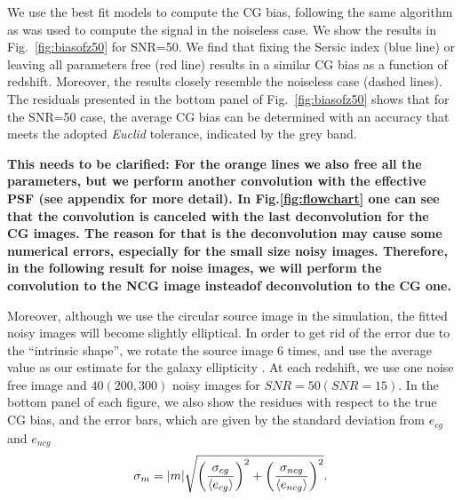 \documentclass[useAMS,usenatbib]{mnras}
\newcommand{\be}{\begin{equation}}
\newcommand{\ee}{\end{equation}}
\newcommand{\rund}[1]{\left(#1\right)}
\def\elabel#1{\label{eq:#1}}
\begin{document}
We use the best fit models to compute the CG bias, following the same
algorithm as was used to compute the signal in the noiseless case. 
We show the results in Fig.~\ref{fig:biasofz50} for SNR=50. We find that
fixing the Sersic index (blue line) or leaving all parameters free (red line)
results in a similar CG bias as a function of redshift. Moreover, the results
closely resemble the noiseless case (dashed lines).  The residuals
presented in the bottom panel of Fig.~\ref{fig:biasofz50} shows that 
for the SNR=50 case, the average CG bias can be determined with an
accuracy that meets the adopted {\it Euclid} tolerance, indicated by the grey band.


{\bf  This needs to be clarified: For the orange lines we also free all
the parameters, but we perform another convolution with the effective
PSF (see appendix for more detail). In Fig.\ref{fig:flowchart} one can
see that the convolution is canceled with the last deconvolution for
the CG images.  The reason for that is the deconvolution may cause
some numerical errors, especially for the small size noisy images.  Therefore, 
in the following result for noise images, we will perform the convolution to the NCG 
image insteadof deconvolution to the CG one.}


Moreover, although we use the circular source image in the simulation,
the fitted noisy images will become slightly elliptical. In order to
get rid of the error due to the ``intrinsic shape'', we rotate the
source image $6$ times, and use the average value as our estimate for
the galaxy ellipticity \citep{2007AJ....133.1763N}. At each redshift,
we use one noise free image and $40 (200, 300)$ noisy images for $SNR=50
(SNR=15)$.  In the bottom panel of each figure, we also show the
residues with respect to the true CG bias, and the error bars, which
are given by the standard deviation from $e_{cg}$ and $e_{ncg}$
%
\be
\sigma_m= |m| \sqrt{\rund{\sigma_{cg} \over \langle e_{cg}\rangle }^2
  + \rund{\sigma_{ncg} \over \langle e_{ncg} \rangle}^2 }.
\elabel{sigmam}
\ee
%
\end{document}
